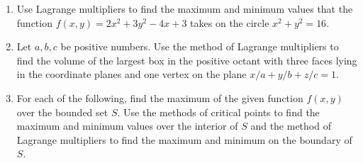 \documentclass[12pt]{article}
\begin{document}
\begin{enumerate}
\item   \begin{minipage}[t]{3.3in}
   Use Lagrange multipliers to find the maximum and minimum values that 
   the function $f(x,y)= 2x^2+3y^2-4x+3$ takes on the circle $x^2+y^2=16$.
  \end{minipage} \qquad 
  \begin{minipage}[t]{204pt}
  \end{minipage}

\item Let $a,b,c$ be positive numbers.
  Use the method of Lagrange multipliers to find the  volume of the largest box in the positive octant  with three faces lying in the
  coordinate planes and one vertex on the plane $x/a+y/b+z/c=1$.    
\vspace{-2pt}



\item For each of the following, find the maximum of the given function $f(x,y)$ over the bounded set $S$.
  Use the methods of critical points to find the maximum and minimum values over the interior of $S$ and the method of Lagrange multipliers
  to find the maximum and minimum on the boundary of $S$.


\end{enumerate}
\end{document}
